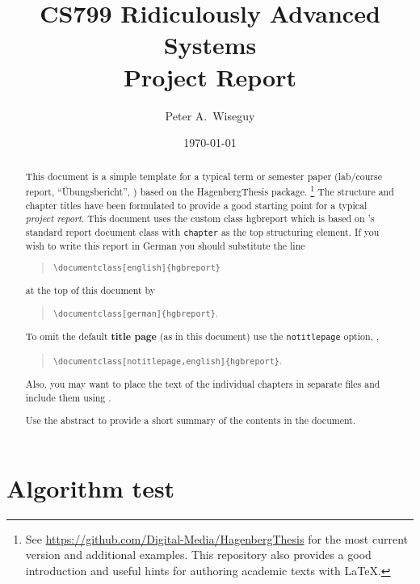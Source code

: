 \documentclass[notitlepage,english]{hgbreport}
\author{Peter A.\ Wiseguy}
\title{CS799 Ridiculously Advanced Systems\\ %
			Project Report}	%
\date{\today}
\begin{document}

\maketitle

\begin{abstract}\noindent
This document is a simple template for a typical term or semester paper (lab/course report, 
``Übungsbericht'', \etc) based on the \textsf{HagenbergThesis} \latex package.%
\footnote{See \url{https://github.com/Digital-Media/HagenbergThesis} for the most current version
and additional examples.
This repository also provides a good introduction and useful hints for authoring academic texts with LaTeX.}
The structure and chapter titles have been formulated to provide a good starting point
for a typical \emph{project report}.
This document uses the custom class \textsf{hgbreport} which is based on \latex's standard \textsf{report} 
document class with \texttt{chapter} as the top structuring element. 
If you wish to write this report in German you should substitute the line
\begin{quote}
	\verb!\documentclass[english]{hgbreport}! 
\end{quote}
at the top of this document by
\begin{quote}
	\verb!\documentclass[german]{hgbreport}!.
\end{quote}
To omit the default \textbf{title page} (as in this document) use the \texttt{notitlepage} option, \eg,
\begin{quote}
	\verb!\documentclass[notitlepage,english]{hgbreport}!.
\end{quote}
Also, you may want to place the text of the individual chapters in separate files and 
include them using \verb!!.

\bigskip
\noindent
Use the abstract to provide a short summary of the contents in the document.
\end{abstract}





\chapter{Algorithm test}
\end{document}
